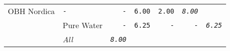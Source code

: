 \documentclass[11pt,A4paper,]{article}
\begin{document}
\begin{longtable}[]{@{}llrrrrr@{}}
\begin{minipage}[t]{0.14\columnwidth}
OBH Nordica\strut
\end{minipage} & \begin{minipage}[t]{0.14\columnwidth}\raggedleft\strut
\texttt{-}\strut
\end{minipage} & \begin{minipage}[t]{0.14\columnwidth}\raggedleft\strut
\texttt{-}\strut
\end{minipage} & \begin{minipage}[t]{0.14\columnwidth}\raggedleft\strut
\texttt{6.00}\strut
\end{minipage} & \begin{minipage}[t]{0.14\columnwidth}\raggedleft\strut
\texttt{2.00}\strut
\end{minipage} & \begin{minipage}[t]{0.14\columnwidth}\raggedleft\strut
\emph{\texttt{8.00}}\strut
\end{minipage}\tabularnewline
\begin{minipage}[t]{0.14\columnwidth}\raggedright\strut
\strut
\end{minipage} & \begin{minipage}[t]{0.14\columnwidth}\raggedright\strut
Pure Water\strut
\end{minipage} & \begin{minipage}[t]{0.14\columnwidth}\raggedleft\strut
\texttt{-}\strut
\end{minipage} & \begin{minipage}[t]{0.14\columnwidth}\raggedleft\strut
\texttt{6.25}\strut
\end{minipage} & \begin{minipage}[t]{0.14\columnwidth}\raggedleft\strut
\texttt{-}\strut
\end{minipage} & \begin{minipage}[t]{0.14\columnwidth}\raggedleft\strut
\texttt{-}\strut
\end{minipage} & \begin{minipage}[t]{0.14\columnwidth}\raggedleft\strut
\emph{\texttt{6.25}}\strut
\end{minipage}\tabularnewline
\begin{minipage}[t]{0.14\columnwidth}\raggedright\strut
\strut
\end{minipage} & \begin{minipage}[t]{0.14\columnwidth}\raggedright\strut
\emph{All}\strut
\end{minipage} & \begin{minipage}[t]{0.14\columnwidth}\raggedleft\strut
\emph{\texttt{8.00}}\strut

\end{minipage}
\end{longtable}
\end{document}
